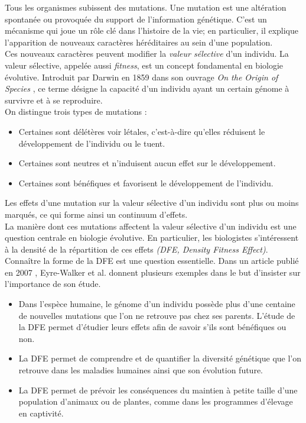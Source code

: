 Tous les organismes subissent des mutations. Une mutation est une altération spontanée ou provoquée du support de l'information génétique. C'est un mécanisme qui joue un rôle clé dans l'histoire de la vie; en particulier, il explique l'apparition de nouveaux caractères héréditaires au sein d'une population. \\
    
Ces nouveaux caractères peuvent modifier la \emph{valeur sélective} d'un individu. La valeur sélective, appelée aussi \emph{fitness}, est un concept fondamental en biologie évolutive. Introduit par Darwin en 1859 dans son ouvrage \textit{On the Origin of Species} \cite{darwin1859origin}, ce terme désigne la capacité d'un individu ayant un certain génome à survivre et à se reproduire.\\
    
    On distingue trois types de mutations : 
        \begin{itemize}
            \item Certaines sont délétères voir létales, c'est-à-dire qu'elles réduisent le développement de l'individu ou le tuent.
            \item Certaines sont neutres et n'induisent aucun effet sur le développement. 
            \item Certaines sont bénéfiques et favorisent le développement de l'individu.
        \end{itemize}
            
    Les effets d'une mutation sur la valeur sélective d'un individu sont plus ou moins marqués, ce qui forme ainsi un continuum d'effets. \\
    
    La manière dont ces mutations affectent la valeur sélective d'un individu est une question centrale en biologie évolutive. En particulier, les biologistes s'intéressent à la densité de la répartition de ces effets \emph{(DFE, Density Fitness Effect)}.\\
    
    Connaître la forme de la DFE est une question essentielle. Dans un article publié en 2007 \cite{eyre2007distribution}, Eyre-Walker et al. donnent plusieurs exemples dans le but d'insister sur l'importance de son étude.
        \begin{itemize}
            \item Dans l'espèce humaine, le génome d'un individu possède plus d'une centaine de nouvelles mutations que l'on ne retrouve pas chez ses parents. L'étude de la DFE permet d'étudier leurs effets afin de savoir s'ils sont bénéfiques ou non.
            \item La DFE permet de comprendre et de quantifier la diversité génétique que l'on retrouve dans les maladies humaines ainsi que son évolution future.
            \item La DFE permet de prévoir les conséquences du maintien à petite taille d'une population d'animaux ou de plantes, comme dans les programmes d'élevage en captivité. \\
        \end{itemize}
        
